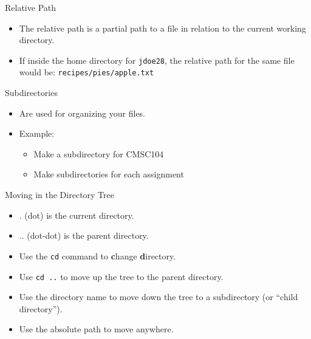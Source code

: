 \documentclass[graphics]{beamer}
\begin{document}
\begin{frame}{Relative Path}
    \begin{itemize}
        \item The relative path is a partial path to a file in relation to the current working directory.
        \item If inside the home directory for \texttt{jdoe28}, the relative path for the same file would be: \texttt{recipes/pies/apple.txt}
    \end{itemize}
\end{frame}

\begin{frame}{Subdirectories}
    \begin{itemize}
        \item Are used for organizing your files.
        \item Example:
        \begin{itemize}
            \item Make a subdirectory for CMSC104
            \item Make subdirectories for each assignment
        \end{itemize}
    \end{itemize}
    \centering
    
\end{frame}

\begin{frame}{Moving in the Directory Tree}
    \begin{itemize}
        \item . (dot) is the current directory.
        \item .. (dot-dot) is the parent directory.
        \item Use the \texttt{cd} command to \textbf{c}hange \textbf{d}irectory.
        \item Use \texttt{cd ..} to move up the tree to the parent directory.
        \item Use the directory name to move down the tree to a subdirectory (or ``child directory'').
        \item Use the absolute path to move anywhere.
    \end{itemize}
\end{frame}
\end{document}
